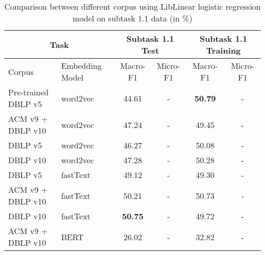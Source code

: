 \begin{table}[htbp!] %
    \begin{tabular}{llcccc}
    \toprule
        \multicolumn{2}{c}{Task}          & \multicolumn{2}{c}{Subtask 1.1 Test} & \multicolumn{2}{c}{Subtask 1.1 Training} \\
    \midrule
        Corpus & Embedding Model          & Macro-F1         & Micro-F1       & Macro-F1         & Micro-F1       \\
    \midrule
        Pre-trained DBLP v5 & word2vec    & 44.61            & -              & \bf50.79         & -              \\
        ACM v9 + DBLP v10   & word2vec    & 47.24            & -              & 49.45            & -              \\
        DBLP v5             & word2vec    & 46.27            & -              & 50.08            & -              \\
        DBLP v10            & word2vec    & 47.28            & -              & 50.28            & -              \\
        DBLP v5             & fastText    & 49.12            & -              & 49.30            & -              \\
        ACM v9 + DBLP v10   & fastText    & 50.21            & -              & 50.73            & -              \\
        DBLP v10            & fastText    & \bf50.75         & -              & 49.72            & -              \\
        ACM v9 + DBLP v10   & BERT        & 26.02            & -              & 32.82            & -              \\
    \bottomrule
    \end{tabular}
\caption{Comparison between different corpus using LibLinear logistic regression model on subtask 1.1 data (in \%)}
\label{tab:embedding}
\end{table}
